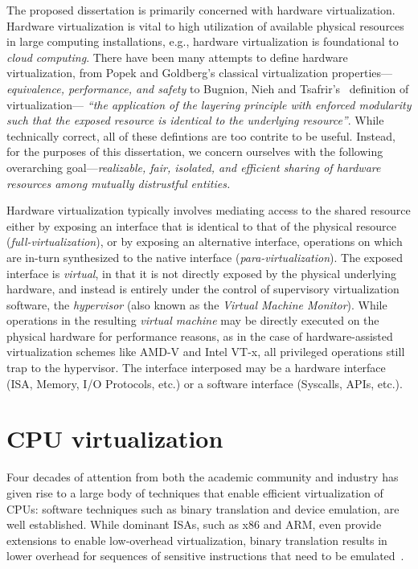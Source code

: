 The proposed dissertation is primarily concerned with hardware virtualization.
Hardware virtualization is vital to high utilization of available physical
resources in large computing installations, e.g., hardware virtualization is
foundational to \textit{cloud computing}.
There have been many attempts to define hardware virtualization, from Popek
and Goldberg's classical virtualization properties---\emph{equivalence,
performance, and safety} to Bugnion, Nieh and
Tsafrir's~\cite{bugnion-nieh-tsafrir} definition of virtualization---%
\textit{``the application of the layering principle with
enforced modularity such that the exposed resource is identical to the
underlying resource''}. While technically correct, all of these defintions are
too contrite to be useful. Instead, for the purposes of this dissertation, we
concern ourselves with the following overarching goal---\emph{realizable,
fair, isolated, and efficient sharing of hardware resources among mutually
distrustful entities.}

Hardware virtualization typically involves mediating access to the shared
resource either by exposing an interface that is identical to that of the
physical resource (\emph{full-virtualization}), or by exposing an alternative
interface, operations on which are in-turn synthesized to the native interface
(\emph{para-virtualization}).
The exposed interface is \emph{virtual}, in that it is not directly exposed by
the physical underlying hardware, and instead is entirely under the control of
supervisory virtualization software, the \emph{hypervisor} (also known as the
\emph{Virtual Machine Monitor}). While operations in the resulting \emph{
virtual machine} may be directly executed on the physical hardware for
performance reasons, as in the case of hardware-assisted virtualization
schemes like AMD-V and Intel VT-x, all privileged operations still trap to the
hypervisor. The interface interposed may be a hardware interface (ISA, Memory,
I/O Protocols, etc.) or a software interface (Syscalls, APIs, etc.).

\section{CPU virtualization}

Four decades of attention from both the academic community and industry has
given rise to a large body of techniques that enable efficient virtualization
of CPUs: software techniques such as binary translation and device emulation,
are well established. While dominant ISAs, such as x86 and ARM, even provide
extensions to enable low-overhead virtualization, binary translation results
in lower overhead for sequences of sensitive instructions that need to be
emulated~\cite{vmware-esx-bt-plus-vtx}.

